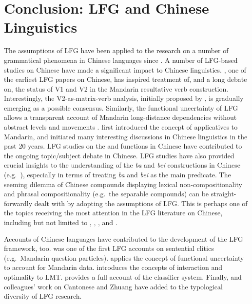 \documentclass[output=paper,chinesefont,hidelinks]{langscibook}
\begin{document}
\section{Conclusion: LFG and Chinese Linguistics}
\label{sec:Sinitic:5}

The assumptions of LFG have been applied to the research on a number of grammatical phenomena in Chinese languages since \citet{Huang1985}. A number of LFG-based studies on Chinese have made a significant impact to Chinese linguistics. \citet{HuangMangione1985}, one of the earliest LFG papers on Chinese, has inspired  treatment of, and a long debate on, the status of V1 and V2 in the Mandarin resultative verb construction. Interestingly, the V2-as-matrix-verb analysis, initially proposed by \citet{HuangMangione1985}, is gradually emerging as a possible consensus. Similarly, the functional uncertainty of LFG allows a transparent account of Mandarin long-distance dependencies without abstract levels and movements \citep{Huang1992}. \citet{Huang1993a} first introduced the concept of applicatives to Mandarin, and initiated many interesting discussions in Chinese linguistics in the past 20 years. LFG studies \citep{Huang1989b,Tan1991,Her1991} on the {\TOPIC} and {\SUBJ} functions in Chinese have contributed to the ongoing topic/subject debate in Chinese. LFG studies have also provided crucial insights to the understanding of the \textit{ba} and \textit{bei} constructions in Chinese (e.g.\ \citealt{Her1989,Bender2000,Her2009}), especially in terms of treating \textit{ba} and \textit{bei} as the main predicate. The seeming dilemma of Chinese compounds displaying lexical non-compositionality and phrasal compositionality (e.g.\ the separable compounds) can be straight-forwardly dealt with by adopting the assumptions of LFG. This is perhaps one of the topics receiving the most attention in the LFG literature on Chinese, including but not limited to \citet{Huang1990}, \citet{HuangLin1992}, \citet{Her1996,Her1997}, and \citet{BodomoYuChe2017}.

  Accounts of Chinese languages have contributed to the development of the LFG framework, too. \citet{ShiuHuang1989} was one of the first LFG accounts on sentential clitics (e.g.\ Mandarin question particles). \citet{Huang1992,Huang1993b} applies the concept of functional uncertainty to account for Mandarin data. \citet{Her2006b} introduces the concepts of interaction and optimality to LMT. \citet{Her2012a,Her2012b} provides a full account of the classifier system. Finally, \citet{BodomoLuke2001} and colleagues' work on Cantonese and Zhuang have added to the typological diversity of LFG research.
\end{document}
